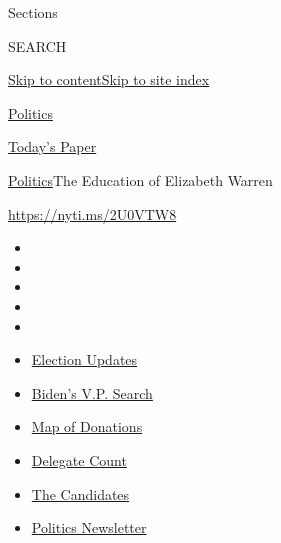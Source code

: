 Sections

SEARCH

\protect\hyperlink{site-content}{Skip to
content}\protect\hyperlink{site-index}{Skip to site index}

\href{https://www.nytimes3xbfgragh.onion/section/politics}{Politics}

\href{https://myaccount.nytimes3xbfgragh.onion/auth/login?response_type=cookie\&client_id=vi}{}

\href{https://www.nytimes3xbfgragh.onion/section/todayspaper}{Today's
Paper}

\href{/section/politics}{Politics}\textbar{}The Education of Elizabeth
Warren

\url{https://nyti.ms/2U0VTW8}

\begin{itemize}
\item
\item
\item
\item
\item
\end{itemize}

\begin{itemize}
\item
  \href{https://www.nytimes3xbfgragh.onion/2020/07/31/us/elections/biden-vs-trump.html?action=click\&pgtype=Article\&state=default\&region=TOP_BANNER\&context=storylines_menu}{Election
  Updates}
\item
  \href{https://www.nytimes3xbfgragh.onion/article/biden-vice-president-2020.html?action=click\&pgtype=Article\&state=default\&region=TOP_BANNER\&context=storylines_menu}{Biden's
  V.P. Search}
\item
  \href{https://www.nytimes3xbfgragh.onion/interactive/2020/07/24/us/politics/trump-biden-campaign-donors.html?action=click\&pgtype=Article\&state=default\&region=TOP_BANNER\&context=storylines_menu}{Map
  of Donations}
\item
  \href{https://www.nytimes3xbfgragh.onion/interactive/2020/us/elections/delegate-count-primary-results.html?action=click\&pgtype=Article\&state=default\&region=TOP_BANNER\&context=storylines_menu}{Delegate
  Count}
\item
  \href{https://www.nytimes3xbfgragh.onion/interactive/2019/us/politics/2020-presidential-candidates.html?action=click\&pgtype=Article\&state=default\&region=TOP_BANNER\&context=storylines_menu}{The
  Candidates}
\item
  \href{https://www.nytimes3xbfgragh.onion/newsletters/politics?action=click\&pgtype=Article\&state=default\&region=TOP_BANNER\&context=storylines_menu}{Politics
  Newsletter}
\end{itemize}

